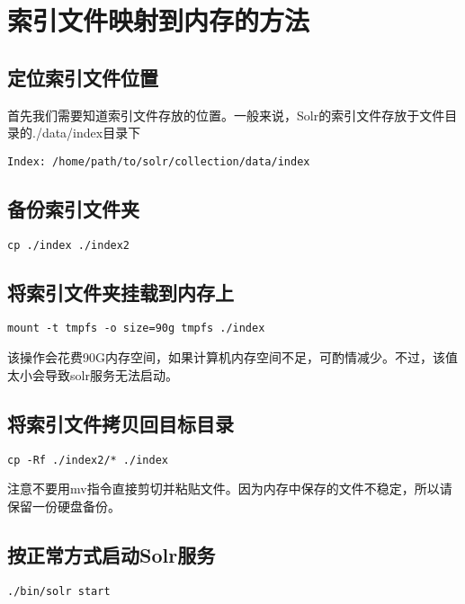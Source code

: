 \chapter{索引文件映射到内存的方法}

\section{定位索引文件位置}
首先我们需要知道索引文件存放的位置。一般来说，Solr的索引文件存放于文件目录的./data/index目录下
\begin{lstlisting}[basicstyle=\small\ttfamily, numbers=none]
Index: /home/path/to/solr/collection/data/index
\end{lstlisting}

\section{备份索引文件夹}
\begin{lstlisting}[basicstyle=\small\ttfamily, numbers=none]
cp ./index ./index2
\end{lstlisting}

\section{将索引文件夹挂载到内存上}
\begin{lstlisting}[basicstyle=\small\ttfamily, numbers=none]
mount -t tmpfs -o size=90g tmpfs ./index
\end{lstlisting}
该操作会花费90G内存空间，如果计算机内存空间不足，可酌情减少。不过，该值太小会导致solr服务无法启动。

\section{将索引文件拷贝回目标目录}
\begin{lstlisting}[basicstyle=\small\ttfamily, numbers=none]
cp -Rf ./index2/* ./index
\end{lstlisting}
注意不要用mv指令直接剪切并粘贴文件。因为内存中保存的文件不稳定，所以请保留一份硬盘备份。

\section{按正常方式启动Solr服务}
\begin{lstlisting}[basicstyle=\small\ttfamily, numbers=none]
./bin/solr start
\end{lstlisting}
